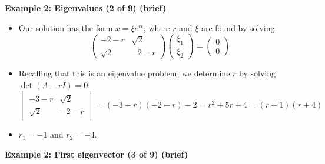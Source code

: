 \documentclass[11pt,a4paper]{article}
\begin{document}
	\textbf{Example 2: Eigenvalues (2 of 9) (brief)}
	\begin{itemize}
		\item Our solution has the form $x = \xi e^{rt}$, where $r$ and $\xi$ are found by solving
		$$
		\begin{pmatrix}
			-2-r & \sqrt{2}\\
			\sqrt{2} & -2-r
		\end{pmatrix}
		\begin{pmatrix}
			\xi_1\\
			\xi_2
		\end{pmatrix}=
		\begin{pmatrix}
			0\\
			0
		\end{pmatrix}
		$$
		\item Recalling that this is an eigenvalue problem, we determine $r$ by solving $\det(A-rI) = 0$:
		$$
		\begin{vmatrix}
			-3-r & \sqrt{2}\\
			\sqrt{2} & -2-r
		\end{vmatrix}=
		(-3-r)(-2-r)-2=r^2+5r+4=(r+1)(r+4)
		$$
		\item $r_1 = -1$ and $r_2 = -4$.
	\end{itemize}
	\textbf{Example 2: First eigenvector (3 of 9) (brief)}
\end{document}
